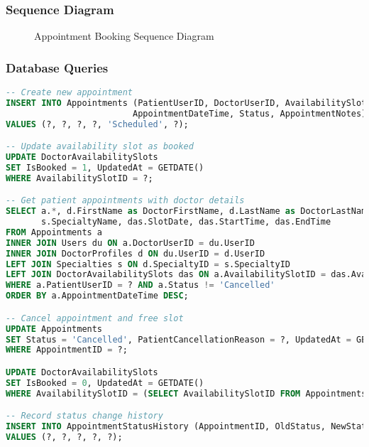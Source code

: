 \documentclass[12pt,a4paper]{article}
\begin{document}
\subsubsection{Sequence Diagram}

\begin{figure}[H]
\centering
{}
\caption{Appointment Booking Sequence Diagram}
\label{fig:appointment-sequence}
\end{figure}

\subsubsection{Database Queries}

\begin{lstlisting}[language=SQL, caption=Appointment Management Queries]
-- Create new appointment
INSERT INTO Appointments (PatientUserID, DoctorUserID, AvailabilitySlotID, 
                         AppointmentDateTime, Status, AppointmentNotes)
VALUES (?, ?, ?, ?, 'Scheduled', ?);

-- Update availability slot as booked
UPDATE DoctorAvailabilitySlots 
SET IsBooked = 1, UpdatedAt = GETDATE() 
WHERE AvailabilitySlotID = ?;

-- Get patient appointments with doctor details
SELECT a.*, d.FirstName as DoctorFirstName, d.LastName as DoctorLastName, 
       s.SpecialtyName, das.SlotDate, das.StartTime, das.EndTime
FROM Appointments a
INNER JOIN Users du ON a.DoctorUserID = du.UserID
INNER JOIN DoctorProfiles d ON du.UserID = d.UserID
LEFT JOIN Specialties s ON d.SpecialtyID = s.SpecialtyID
LEFT JOIN DoctorAvailabilitySlots das ON a.AvailabilitySlotID = das.AvailabilitySlotID
WHERE a.PatientUserID = ? AND a.Status != 'Cancelled'
ORDER BY a.AppointmentDateTime DESC;

-- Cancel appointment and free slot
UPDATE Appointments 
SET Status = 'Cancelled', PatientCancellationReason = ?, UpdatedAt = GETDATE()
WHERE AppointmentID = ?;

UPDATE DoctorAvailabilitySlots 
SET IsBooked = 0, UpdatedAt = GETDATE() 
WHERE AvailabilitySlotID = (SELECT AvailabilitySlotID FROM Appointments WHERE AppointmentID = ?);

-- Record status change history
INSERT INTO AppointmentStatusHistory (AppointmentID, OldStatus, NewStatus, ChangeReason, ChangedByUserID)
VALUES (?, ?, ?, ?, ?);
\end{lstlisting}
\end{document}
